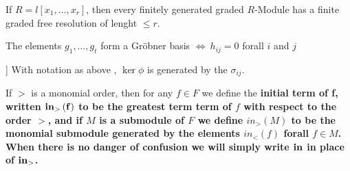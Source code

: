 \documentclass{article}
\begin{document}






\begin{thm}
	If \( R = l \left[ x_{1}, \dots ,x_{r} \right] \), 
then every finitely generated graded \( R\)-Module has a finite graded free resolution of lenght \( \le r  \).
\end{thm}



\begin{thm}
	The elements \( g_1,\dots,g_t \) form a Gr\"obner basis \( \iff \ h_{ij}=0 \) forall \( i\) and \(j\)
\end{thm}

\begin{lem}[\cite{Eis1}[15.1]\label{syzygy_generation}]
	With notation as above %
	,
	\( \ker \phi \)
	is generated by the 
	\( \sigma_{ij}\).
\end{lem}

\begin{defn}
	If \( > \) is a monomial order, 
	then for any \( f \in F \) we define the \bf{initial term of f}, 
	written \( \bf{in}_{>}\left( f \right) \) 
	to be the greatest term term of \( f \) 
	with respect to the order \( > \), 
	and if \( M \) is a submodule of \( F\) 
	we define \( in_{>}\left( M \right) \) 
	to be the monomial submodule generated by 
	the elements \( in_{<} \left( f \right) \) 
	forall \( f \in M \). 
	When there is no danger of confusion 
	we will simply write \( \bf{in} \) in place of \( \bf{in}_{>} \).
\end{defn}


\end{document}
